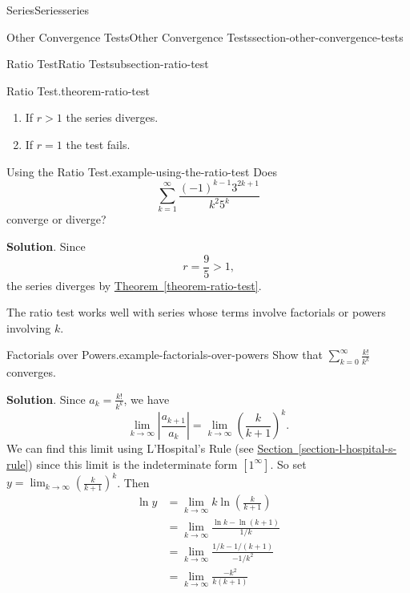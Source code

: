 \documentclass[oneside,10pt,]{book}
\numberwithin{equation}{section}
\newcommand{\lt}{<}
\newcommand{\gt}{>}
\newcommand{\amp}{&}
\begin{document}
\begin{chapterptx}{Series}{}{Series}{}{}{series}
\begin{sectionptx}{Other Convergence Tests}{}{Other Convergence Tests}{}{}{section-other-convergence-tests}
\begin{subsectionptx}{Ratio Test}{}{Ratio Test}{}{}{subsection-ratio-test}
\begin{theorem}{Ratio Test.}{}{theorem-ratio-test}
\begin{enumerate}
If \(r \lt 1\) the series converges absolutely.%
\item\hypertarget{li-102}{}\hypertarget{p-916}{}%
If \(r \gt 1\) the series diverges.%
\item\hypertarget{li-103}{}\hypertarget{p-917}{}%
If \(r = 1\) the test fails.%
\end{enumerate}
%
\end{theorem}
\begin{example}{Using the Ratio Test.}{example-using-the-ratio-test}%
\hypertarget{p-918}{}%
Does%
\begin{equation*}
\sum_{k=1}^{\infty}\frac{(-1)^{k-1}3^{2k+1}}{k^{2}5^{k}}
\end{equation*}
converge or diverge?%
\par\smallskip%
\noindent\textbf{Solution}.\hypertarget{solution-188}{}\quad%
\hypertarget{p-919}{}%
Since%
\begin{equation*}
r = \frac{9}{5} \gt 1\text{,}
\end{equation*}
the series diverges by \hyperref[theorem-ratio-test]{Theorem~\ref{theorem-ratio-test}}.%
\end{example}
\hypertarget{p-920}{}%
The ratio test works well with series whose terms involve factorials or powers involving \(k\).%
\begin{example}{Factorials over Powers.}{example-factorials-over-powers}%
\hypertarget{p-921}{}%
Show that \(\sum_{k=0}^{\infty}\frac{k!}{k^{k}}\) converges.%
\par\smallskip%
\noindent\textbf{Solution}.\hypertarget{solution-189}{}\quad%
\hypertarget{p-922}{}%
Since \(a_{k} = \frac{k!}{k^{k}}\), we have%
\begin{equation*}
\lim_{k\to\infty}\left|\frac{a_{k+1}}{a_{k}}\right| = \lim_{k\to\infty}\left(\frac{k}{k+1}\right)^{k}\text{.}
\end{equation*}
We can find this limit using L'Hospital's Rule (see \hyperref[section-l-hospital-s-rule]{Section~\ref{section-l-hospital-s-rule}}) since this limit is the indeterminate form \([1^{\infty}]\). So set \(y = \lim_{k\to\infty}\left(\frac{k}{k+1}\right)^{k}\). Then%
\begin{align*}
\ln y \amp = \lim_{k\to\infty}k\ln\left(\frac{k}{k+1}\right) \\
\amp = \lim_{k\to\infty}\frac{\ln k - \ln(k+1)}{1/k} \\
\amp = \lim_{k\to\infty}\frac{1/k - 1/(k+1)}{-1/k^{2}} \\
\amp = \lim_{k\to\infty}\frac{-k^{2}}{k(k+1)} \\

\end{align*}
\end{example}
\end{subsectionptx}
\end{sectionptx}
\end{chapterptx}
\end{document}
